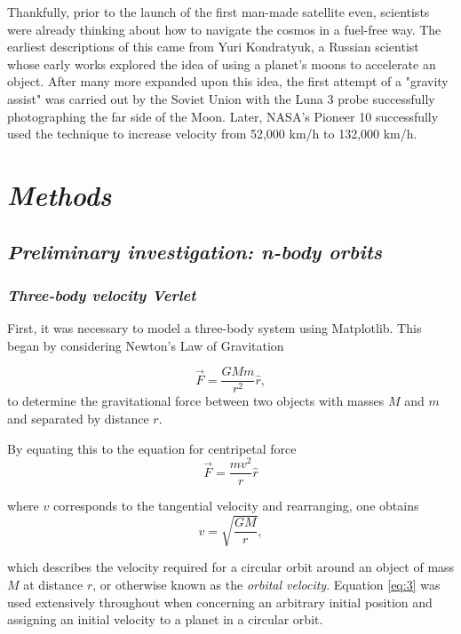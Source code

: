 \documentclass[12pt, english]{report}
\begin{document}
\normalsize{Thankfully, prior to the launch of the first man-made satellite even, scientists were already thinking about how to navigate the cosmos in a fuel-free way. The earliest descriptions of this came from Yuri Kondratyuk, a Russian scientist whose early works explored the idea of using a planet's moons to accelerate an object. After many more expanded upon this idea, the first attempt of a "gravity assist" was carried out by the Soviet Union with the Luna 3 probe successfully photographing the far side of the Moon. Later, NASA's Pioneer 10 successfully used the technique to increase velocity from 52,000 km/h to 132,000 km/h.



%

\chapter{\textsl{Methods}}

\section{\textsl{Preliminary investigation: n-body orbits}}
\subsection{\textsl{Three-body velocity Verlet}}

\normalsize{\noindent First, it was necessary to model a three-body system using Matplotlib. This began by considering Newton's Law of Gravitation

\begin{equation} \label{eq:1}
    \vec{F} = \frac{GMm}{r^2} \hat{r},
\end{equation}
to determine the gravitational force between two objects with masses $M$ and $m$ and separated by distance $r$.} By equating this to the equation for centripetal force \begin{equation}
    \vec{F} = \frac{mv^2}{r} \hat{r}
\end{equation}

where $v$ corresponds to the tangential velocity and rearranging, one obtains 
\begin{equation} \label{eq:3}
    v = \sqrt{\frac{GM}{r}},
\end{equation}

which describes the velocity required for a circular orbit around an object of mass $M$ at distance $r$, or otherwise known as the \emph{orbital velocity}. Equation \ref{eq:3} was used extensively throughout when concerning an arbitrary initial position and assigning an initial velocity to a planet in a circular orbit.}
\end{document}
